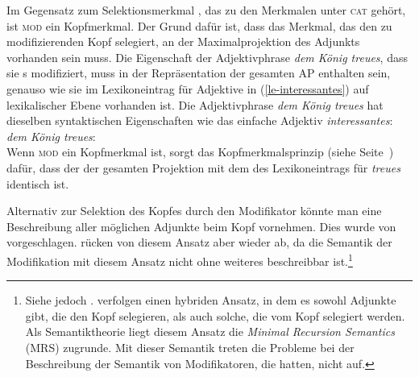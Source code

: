 Im Gegensatz zum Selektionsmerkmal \subcat, das zu den Merkmalen unter \textsc{cat}  gehört,
ist \textsc{mod} ein Kopfmerkmal.
Der Grund dafür ist, dass das Merkmal, das den zu modifizierenden Kopf selegiert, an der
Maximalprojektion des Adjunkts vorhanden sein muss. Die Eigenschaft der Adjektivphrase \emph{dem
König treues}, dass sie \nbar{}s modifiziert, muss in der Repräsentation der gesamten AP enthalten sein,
genauso wie sie im Lexikoneintrag für Adjektive in (\ref{le-interessantes}) auf lexikalischer Ebene
vorhanden ist. Die Adjektivphrase \emph{dem König treues} hat dieselben syntaktischen Eigenschaften wie das einfache
Adjektiv \emph{interessantes}:
\ea
\label{avm-dem-koenig-treues}
\emph{dem König treues}:\\
\z
Wenn \textsc{mod} ein Kopfmerkmal ist, sorgt das Kopfmerkmalsprinzip (siehe Seite~\pageref{prinzip-hfp})
dafür, dass der \modw der gesamten Projektion mit dem \modw des Lexikoneintrags für \emph{treues} identisch ist.


Alternativ zur Selektion des Kopfes durch den Modifikator könnte man eine
Beschreibung aller möglichen Adjunkte beim Kopf vornehmen. Dies wurde von
\citet[]{ps} vorgeschlagen. \citet[Abschnitt~1.9]{ps2} rücken von diesem Ansatz aber wieder
ab, da die Semantik der Modifikation mit diesem Ansatz nicht ohne weiteres
beschreibbar ist.\footnote{
        Siehe jedoch . \citet*{BMS2001a} verfolgen einen hybriden Ansatz, in dem es sowohl Adjunkte gibt,
        die den Kopf selegieren, als auch solche, die vom Kopf selegiert werden.
        Als Semantiktheorie liegt diesem Ansatz die \textit{Minimal Recursion Semantics}
        (MRS)
        zugrunde. Mit dieser Semantik treten die Probleme bei der Beschreibung der Semantik
        von Modifikatoren, die \citet*{ps} hatten, nicht auf.
}


